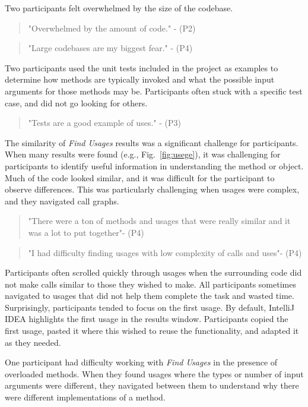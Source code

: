 \documentclass[conference]{IEEEtran}
\begin{document}
\noindent Two participants felt overwhelmed by the size of the codebase.
\begin{quote}"Overwhelmed by the amount of code." - (P2) \end{quote}
\begin{quote}"Large codebases are my biggest fear." - (P4) \end{quote}

Two participants used the unit tests included in the project as examples to determine how methods are typically invoked and what the possible input arguments for those methods may be. Participants often stuck with a specific test case, and did not go looking for others. 
\begin{quote} "Tests are a good example of uses." - (P3)\end{quote}

The similarity of \textit{Find Usages} results was a significant challenge for participants. When many results were found (e.g., Fig.~\ref{fig:usege}), it was challenging for participants to identify useful information in understanding the method or object. 
Much of the code looked similar, and it was difficult for the participant to observe differences. This was particularly challenging when usages were complex, and they navigated call graphs.
\begin{quote}"There were a ton of methods and usages that were really similar and it was a lot to put together"- (P4)\end{quote}
\begin{quote}"I had difficulty finding usages with low complexity of calls and uses"- (P4)\end{quote}

Participants often scrolled quickly through usages when the surrounding code did not make calls similar to those they wished to make. All participants sometimes navigated to usages that did not help them complete the task and wasted time. 
Surprisingly, participants tended to focus on the first usage. By default, IntelliJ IDEA highlights the first usage in the results window. Participants copied the first usage, pasted it where this wished to reuse the functionality, and adapted it as they needed.\par 

One participant had difficulty working with \textit{Find Usages} in the presence of overloaded methods. When they found usages where the types or number of input arguments were different, they navigated between them to understand why there were different implementations of a method.
\end{document}
